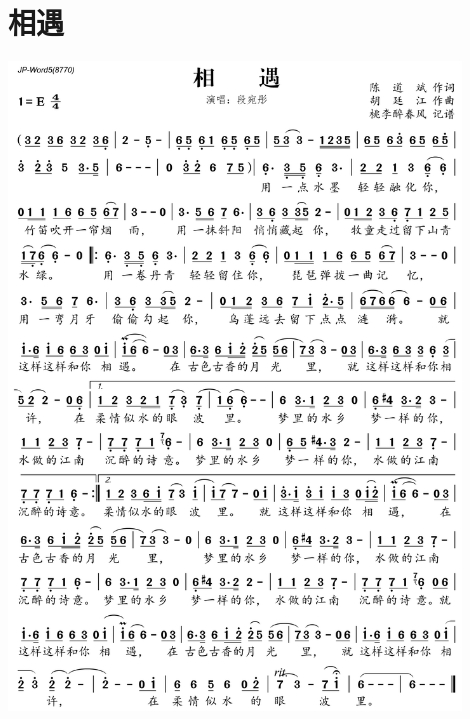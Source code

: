 \documentclass[cn,pad,twocol]{elegantbook}
\begin{document}
\section{相遇} \includegraphics[width=0.9\textwidth]{macos/2020相遇.png}
\end{document}
